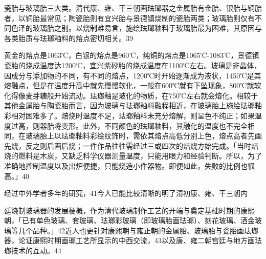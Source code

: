 \noindent 瓷胎与玻璃胎三大类。清代康、雍、干三朝画珐瑯器之金属胎有金胎、银胎与铜胎者，以铜胎最常见；陶瓷胎则有宜兴胎与景德镇烧制的瓷胎两类；玻璃胎则仅有不同色泽的玻璃胎之别。以烧制难易言，施绘珐瑯釉料于玻璃胎最为困难，其原因与各类胎质与珐瑯釉料的熔点密切相关。39

黄金的熔点是1063℃，白银的熔点是960℃，纯铜的熔点是1065℃-1083℃，景德镇瓷胎的烧成温度达1200℃，宜兴紫砂胎的烧成温度在1100℃左右。玻璃是非晶体，因成分与添加物的不同，有不同的熔点，1200℃时开始逐渐成为液状，1450℃是其熔融点，但是在温度升高中就先慢慢软化，一般在600℃就有下坠现象，800℃就软化得像麦芽糖般开始流动。珐瑯釉是玻化的物质，在750℃左右就会熔化。相较于其他金属胎与陶瓷胎而言，因为玻璃与珐瑯釉料融程相近，在玻璃胎上施绘珐瑯釉彩相对困难多了。焙烧时温度不足，珐瑯釉料未充分熔解，则呈色不纯正；如果温度过高，则器胎将变形。此外，不同颜色的珐瑯釉料，其融化的温度也不完全相同，在玻璃胎上以珐瑯釉料彩绘纹饰时，需依其熔点高低分别上色，熔点高者先画先烧，反之则后画后烧；一件作品往往需经过三或四次的焙烧方始完成。「当时焙烧的燃料是木炭，又缺乏科学仪器测量温度，只能用眼力和经验判断。所以，为了准确地控制温度以及出炉便捷，只能烧造小件器物。即便如此，失败的比例也很高。」40

经过中外学者多年的研究，41今人已能比较清晰的明了清初康、雍、干三朝内

\vfill
\begin{BookNotes}
\end{BookNotes}

\noindent 廷烧制玻璃器的发展梗概，作为清代玻璃制作工艺的开端与奠定基础时期的康熙朝，「已有单色玻璃、套玻璃、珐瑯彩玻璃（即玻璃胎画珐瑯）、刻花玻璃、洒金玻璃等几个品种。」42近人也更针对康熙朝与雍正朝的金属胎、玻璃胎与瓷胎画珐瑯器，论证康熙时期画瑯工艺所显示的中西交流，43以及康、雍二朝宫廷与地方画珐瑯技术的互动。44

